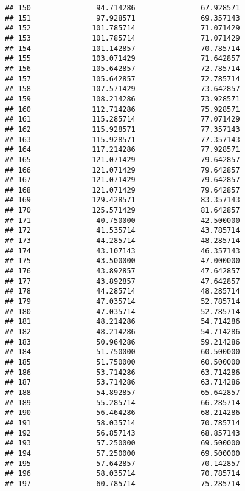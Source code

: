 \documentclass[]{article}
\begin{document}
\begin{verbatim}
## 150               94.714286               67.928571
## 151               97.928571               69.357143
## 152              101.785714               71.071429
## 153              101.785714               71.071429
## 154              101.142857               70.785714
## 155              103.071429               71.642857
## 156              105.642857               72.785714
## 157              105.642857               72.785714
## 158              107.571429               73.642857
## 159              108.214286               73.928571
## 160              112.714286               75.928571
## 161              115.285714               77.071429
## 162              115.928571               77.357143
## 163              115.928571               77.357143
## 164              117.214286               77.928571
## 165              121.071429               79.642857
## 166              121.071429               79.642857
## 167              121.071429               79.642857
## 168              121.071429               79.642857
## 169              129.428571               83.357143
## 170              125.571429               81.642857
## 171               40.750000               42.500000
## 172               41.535714               43.785714
## 173               44.285714               48.285714
## 174               43.107143               46.357143
## 175               43.500000               47.000000
## 176               43.892857               47.642857
## 177               43.892857               47.642857
## 178               44.285714               48.285714
## 179               47.035714               52.785714
## 180               47.035714               52.785714
## 181               48.214286               54.714286
## 182               48.214286               54.714286
## 183               50.964286               59.214286
## 184               51.750000               60.500000
## 185               51.750000               60.500000
## 186               53.714286               63.714286
## 187               53.714286               63.714286
## 188               54.892857               65.642857
## 189               55.285714               66.285714
## 190               56.464286               68.214286
## 191               58.035714               70.785714
## 192               56.857143               68.857143
## 193               57.250000               69.500000
## 194               57.250000               69.500000
## 195               57.642857               70.142857
## 196               58.035714               70.785714
## 197               60.785714               75.285714

\end{verbatim}
\end{document}
